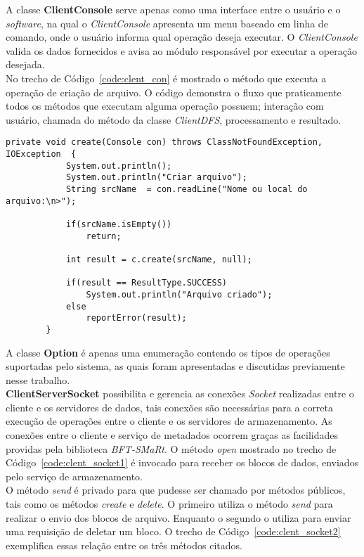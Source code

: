 A classe \textbf{ClientConsole} serve apenas como uma interface entre o usuário e o \textit{software}, na qual o \textit{ClientConsole} apresenta um menu baseado em linha de comando, onde o usuário informa qual operação deseja executar. O \textit{ClientConsole} valida os dados fornecidos e avisa ao módulo responsável por executar a operação desejada.
\\

No trecho de Código~\ref{code:clent_con} é mostrado o método que executa a operação de criação de arquivo. O código demonstra o fluxo que praticamente todos os métodos que executam alguma operação possuem; interação com usuário, chamada do método da classe \textit{ClientDFS}, processamento e resultado.
\\

\begin{lstlisting}[basicstyle=\ttfamily\footnotesize, frame=single, caption=Exemplo de método da classe ClientConsole, label=code:clent_con]
		private void create(Console con) throws ClassNotFoundException, IOException  {
			System.out.println();
			System.out.println("Criar arquivo");
			String srcName  = con.readLine("Nome ou local do arquivo:\n>");
			
			if(srcName.isEmpty())
				return;
			
			int result = c.create(srcName, null);
			
			if(result == ResultType.SUCCESS)
				System.out.println("Arquivo criado");
			else
				reportError(result);
		}
\end{lstlisting}

A classe \textbf{Option} é apenas uma enumeração contendo os tipos de operações suportadas pelo sistema, as quais foram apresentadas e discutidas previamente nesse trabalho.
\\

\textbf{ClientServerSocket} possibilita e gerencia as conexões \textit{Socket} realizadas entre o cliente e os servidores de dados, tais conexões são necessárias para a correta execução de operações entre o cliente e os servidores de armazenamento. As conexões entre o cliente e serviço de metadados ocorrem graças as facilidades providas pela biblioteca \textit{BFT-SMaRt}. O método \textit{open} mostrado no trecho de Código~\ref{code:clent_socket1} é invocado para receber os blocos de dados, enviados pelo serviço de armazenamento.
\\

O método \textit{send} é privado para que pudesse ser chamado por métodos públicos,  tais como os métodos \textit{create} e \textit{delete}. O primeiro utiliza o método \textit{send} para realizar o envio dos blocos de arquivo. Enquanto o segundo o utiliza para enviar uma requisição de deletar um bloco. O trecho de Código~\ref{code:clent_socket2} exemplifica essas relação entre os três métodos citados.
\\
\\
\\
\\
\\


